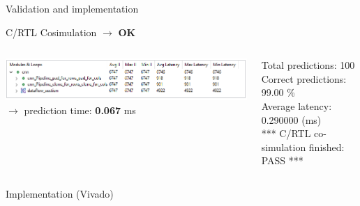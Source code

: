 \documentclass[10pt, xcolor=dvipsnames, compress]{beamer}
\begin{document}
\begin{frame}{Validation and implementation}

    \hspace*{-2.2em} C/RTL Cosimulation $\rightarrow$ \textbf{OK}

    \vspace*{.5em}
    \begin{columns}[T]
        \begin{column}{.6\textwidth}
            \includegraphics[width=\textwidth]{Synthesis-result/co_simulation.png}\\
            $\rightarrow$ prediction time: \textbf{0.067} ms
        \end{column}

        \begin{column}{.4\textwidth}


        {
            \ttfamily
            \tiny
            \linespread{1}
            Total predictions: 100\\
            Correct predictions: 99.00 \%\\
            Average latency: 0.290000 (ms)\\
            *** C/RTL co-simulation finished: PASS ***\\


        }

        \end{column}

    \end{columns}


    \vspace*{1em}

    \hspace*{-2.2em} Implementation (Vivado)

    \vspace*{.5em}



\end{frame}
\end{document}
